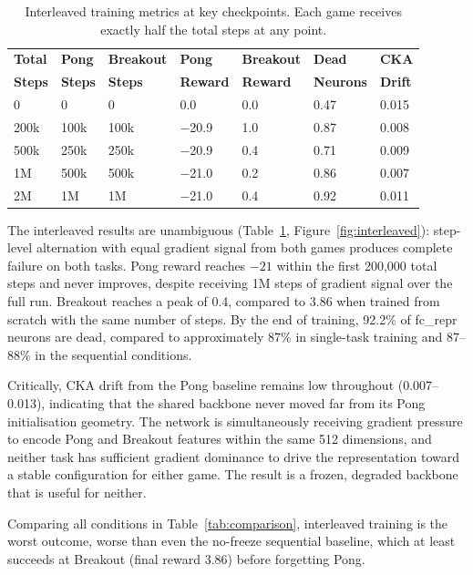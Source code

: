 \documentclass[a4paper]{article}
\begin{document}
\begin{table}[H]
\centering
\caption{Interleaved training metrics at key checkpoints. Each game receives exactly half
the total steps at any point.}
\label{tab:interleaved}
\begin{tabularx}{\linewidth}{XXXXXXX}
\toprule
\textbf{Total} & \textbf{Pong} & \textbf{Breakout} & \textbf{Pong} & \textbf{Breakout} & \textbf{Dead} & \textbf{CKA} \\
\textbf{Steps} & \textbf{Steps} & \textbf{Steps} & \textbf{Reward} & \textbf{Reward} & \textbf{Neurons} & \textbf{Drift} \\
\midrule
0       & 0      & 0      & 0.0   & 0.0 & 0.47 & 0.015 \\
200k    & 100k   & 100k   & $-$20.9 & 1.0 & 0.87 & 0.008 \\
500k    & 250k   & 250k   & $-$20.9 & 0.4 & 0.71 & 0.009 \\
1M      & 500k   & 500k   & $-$21.0 & 0.2 & 0.86 & 0.007 \\
2M      & 1M     & 1M     & $-$21.0 & 0.4 & 0.92 & 0.011 \\
\bottomrule
\end{tabularx}
\end{table}

The interleaved results are unambiguous (Table~\ref{tab:interleaved},
Figure~\ref{fig:interleaved}): step-level alternation with equal gradient signal from both
games produces complete failure on both tasks. Pong reward reaches $-21$ within
the first 200,000 total steps and never improves, despite receiving 1M steps of gradient
signal over the full run. Breakout reaches a peak of 0.4, compared to 3.86 when trained
from scratch with the same number of steps. By the end of training, 92.2\% of fc\_repr
neurons are dead, compared to approximately 87\% in single-task training and 87--88\% in
the sequential conditions.

Critically, CKA drift from the Pong baseline remains low throughout (0.007--0.013),
indicating that the shared backbone never moved far from its Pong initialisation geometry.
The network is simultaneously receiving gradient pressure to encode Pong and Breakout
features within the same 512 dimensions, and neither task has sufficient gradient
dominance to drive the representation toward a stable configuration for either game. The
result is a frozen, degraded backbone that is useful for neither.

Comparing all conditions in Table~\ref{tab:comparison}, interleaved training is the worst
outcome, worse than even the no-freeze sequential baseline, which at least succeeds at
Breakout (final reward 3.86) before forgetting Pong.
\end{document}
